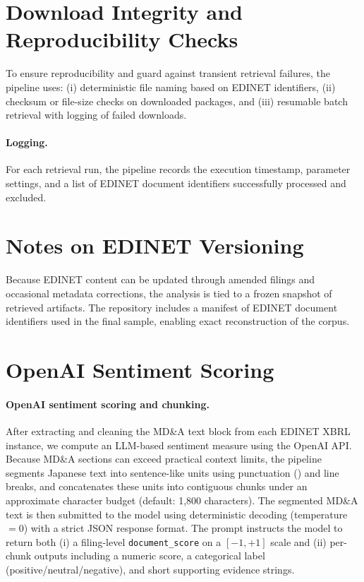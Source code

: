 \section{Download Integrity and Reproducibility Checks}
\label{appendix:edinet_integrity}

To ensure reproducibility and guard against transient retrieval failures, the pipeline uses:
(i) deterministic file naming based on EDINET identifiers, (ii) checksum or file-size checks on downloaded packages, and
(iii) resumable batch retrieval with logging of failed downloads.

\paragraph{Logging.}
For each retrieval run, the pipeline records the execution timestamp, parameter settings, and a list of EDINET document identifiers successfully processed and excluded.

\section{Notes on EDINET  Versioning}
\label{appendix:edinet_versioning}

Because EDINET content can be updated through amended filings and occasional metadata corrections, the analysis is tied to a frozen snapshot of retrieved artifacts. The repository includes a manifest of EDINET document identifiers used in the final sample, enabling exact reconstruction of the corpus.

\section{OpenAI Sentiment Scoring}
\label{app:openai_scoring}

\paragraph{OpenAI sentiment scoring and chunking.}
After extracting and cleaning the MD\&A text block from each EDINET XBRL instance, we compute an LLM-based
sentiment measure using the OpenAI API. Because MD\&A sections can exceed practical context limits, the pipeline
segments Japanese text into sentence-like units using punctuation () and line breaks, and concatenates these
units into contiguous chunks under an approximate character budget (default: 1{,}800 characters). The segmented
MD\&A text is then submitted to the model using deterministic decoding (temperature $=0$) with a strict JSON
response format. The prompt instructs the model to return both (i) a filing-level \texttt{document\_score} on a
$[-1,+1]$ scale and (ii) per-chunk outputs including a numeric score, a categorical label
(positive/neutral/negative), and short supporting evidence strings.


